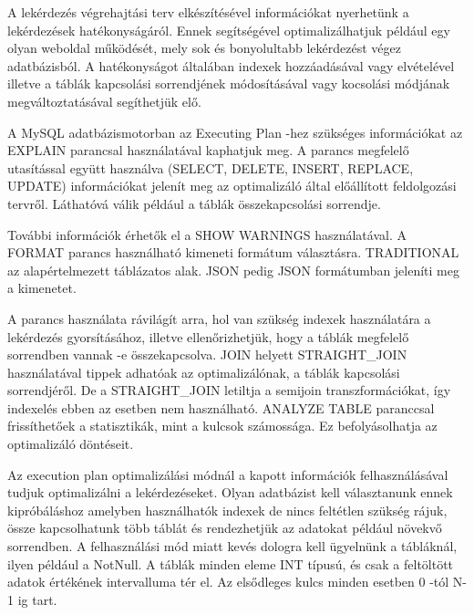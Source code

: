 

A lekérdezés végrehajtási terv elkészítésével információkat nyerhetünk a lekérdezések hatékonyságáról. Ennek segítségével optimalizálhatjuk például egy olyan weboldal működését, mely sok és bonyolultabb lekérdezést végez adatbázisból. A hatékonyságot általában indexek hozzáadásával vagy elvételével illetve a táblák kapcsolási sorrendjének módosításával vagy kocsolási módjának megváltoztatásával segíthetjük elő.


A MySQL adatbázismotorban az Executing Plan -hez szükséges információkat az EXPLAIN parancsal használatával kaphatjuk meg.
A parancs megfelelő utasítással együtt használva (SELECT, DELETE, INSERT, REPLACE, UPDATE)  információkat jelenít meg az optimalizáló által előállított feldolgozási tervről. Láthatóvá válik például a táblák összekapcsolási sorrendje.

További információk érhetők el a SHOW WARNINGS használatával.
A FORMAT parancs használható kimeneti formátum választásra. TRADITIONAL az alapértelmezett táblázatos alak. JSON pedig JSON formátumban jeleníti meg a kimenetet.

A parancs használata rávilágít arra, hol van szükség indexek használatára a lekérdezés gyorsításához, illetve ellenőrizhetjük, hogy a táblák megfelelő sorrendben vannak -e összekapcsolva. 
JOIN helyett STRAIGHT\_JOIN használatával tippek adhatóak az optimalizálónak, a táblák kapcsolási sorrendjéről. De a STRAIGHT\_JOIN letiltja a semijoin transzformációkat, így indexelés ebben az esetben nem használható.
ANALYZE TABLE paranccsal frissíthetőek a statisztikák, mint a kulcsok számossága. Ez befolyásolhatja az optimalizáló döntéseit. 



Az execution plan optimalizálási módnál a kapott információk felhasználásával tudjuk optimalizálni a lekérdezéseket.
Olyan adatbázist kell választanunk ennek kipróbáláshoz amelyben használhatók indexek de nincs feltétlen szükség rájuk, össze kapcsolhatunk több táblát és rendezhetjük az adatokat például növekvő sorrendben. A felhasználási mód miatt kevés dologra kell ügyelnünk a tábláknál, ilyen például a NotNull. A táblák minden eleme INT típusú, és csak a feltöltött adatok értékének intervalluma tér el. Az elsődleges kulcs minden esetben 0 -tól N-1 ig tart.

